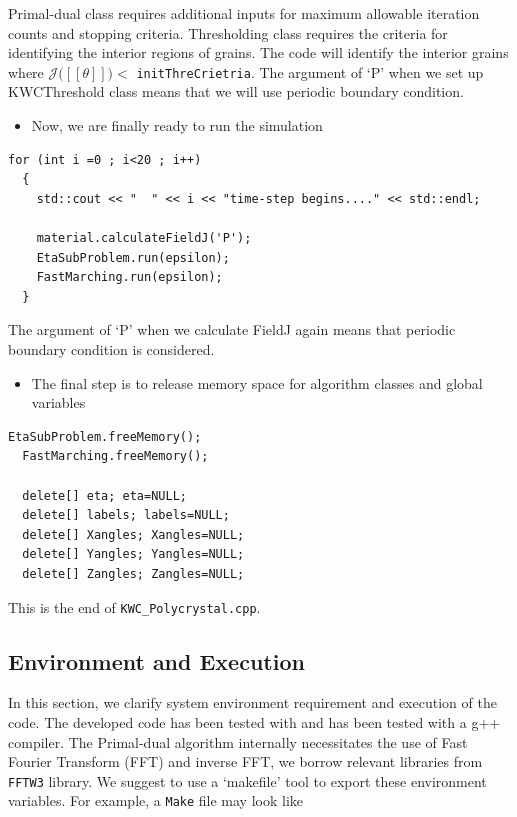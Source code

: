\documentclass[11pt]{article}
\begin{document}
Primal-dual class requires additional inputs for maximum allowable 
iteration counts and stopping criteria. 
Thresholding class requires the criteria for identifying the interior regions
of grains. The code will identify the interior grains where 
$\mathcal{J}\big( [\![ \theta]\!]\big) <$ \texttt{initThreCrietria}.
The argument of `P'  when we set up KWCThreshold class means that we will use
periodic boundary condition. 

\begin{itemize} \item Now, we are finally ready to run the simulation \end{itemize}

\begin{tcolorbox}
\begin{lstlisting}[basicstyle=\footnotesize]
  for (int i =0 ; i<20 ; i++)
  {
    std::cout << "  " << i << "time-step begins...." << std::endl;
    
    material.calculateFieldJ('P');
    EtaSubProblem.run(epsilon);
    FastMarching.run(epsilon);
  }
\end{lstlisting}
\end{tcolorbox}
The argument of `P'  when we calculate FieldJ again means 
that periodic boundary condition is considered.


\begin{itemize} \item The final step is 
to release memory space for algorithm classes and global variables \end{itemize}

\begin{tcolorbox}
\begin{lstlisting}[basicstyle=\footnotesize]
  EtaSubProblem.freeMemory();
  FastMarching.freeMemory();
  
  delete[] eta; eta=NULL;
  delete[] labels; labels=NULL;
  delete[] Xangles; Xangles=NULL;
  delete[] Yangles; Yangles=NULL;
  delete[] Zangles; Zangles=NULL;
\end{lstlisting}
\end{tcolorbox}

This is the end of \texttt{KWC\_Polycrystal.cpp}. 


\subsection{Environment and Execution}

In this section, we clarify system environment requirement 
and execution of the code.
The developed code has been tested with 
and has been tested with a g++ compiler. 
The Primal-dual algorithm internally necessitates the use of 
Fast Fourier Transform (FFT) and inverse FFT,
we borrow relevant libraries from \texttt{FFTW3} library. 
We suggest to use a `makefile' tool to export these environment variables.
For example, a \texttt{Make} file may look like\\
\end{document}
